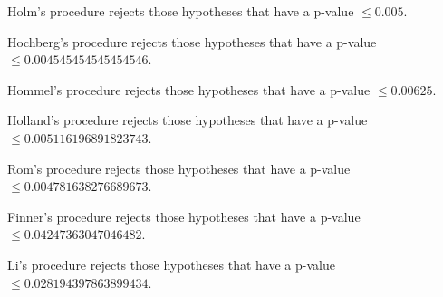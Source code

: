 \documentclass[a4paper,10pt]{article}
\begin{document}
\begin{landscape}
Holm's procedure rejects those hypotheses that have a p-value $\le0.005$.


Hochberg's procedure rejects those hypotheses that have a p-value $\le0.004545454545454546$.


Hommel's procedure rejects those hypotheses that have a p-value $\le0.00625$.


Holland's procedure rejects those hypotheses that have a p-value $\le0.005116196891823743$.


Rom's procedure rejects those hypotheses that have a p-value $\le0.004781638276689673$.


Finner's procedure rejects those hypotheses that have a p-value $\le0.04247363047046482$.


Li's procedure rejects those hypotheses that have a p-value $\le0.028194397863899434$.



\newpage


\end{landscape}
\end{document}
